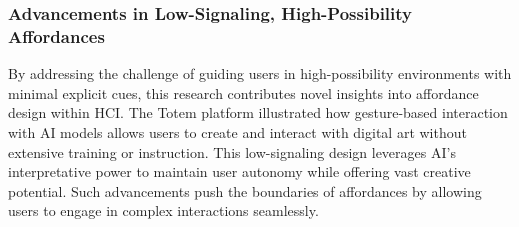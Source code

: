     

\subsubsection{Advancements in Low-Signaling, High-Possibility Affordances}
By addressing the challenge of guiding users in high-possibility environments with minimal explicit cues, this research contributes novel insights into affordance design within HCI.
The Totem platform illustrated how gesture-based interaction with AI models allows users to create and interact with digital art without extensive training or instruction. %
This low-signaling design leverages AI’s interpretative power to maintain user autonomy while offering vast creative potential.
Such advancements push the boundaries of affordances by allowing users to engage in complex interactions seamlessly.%

